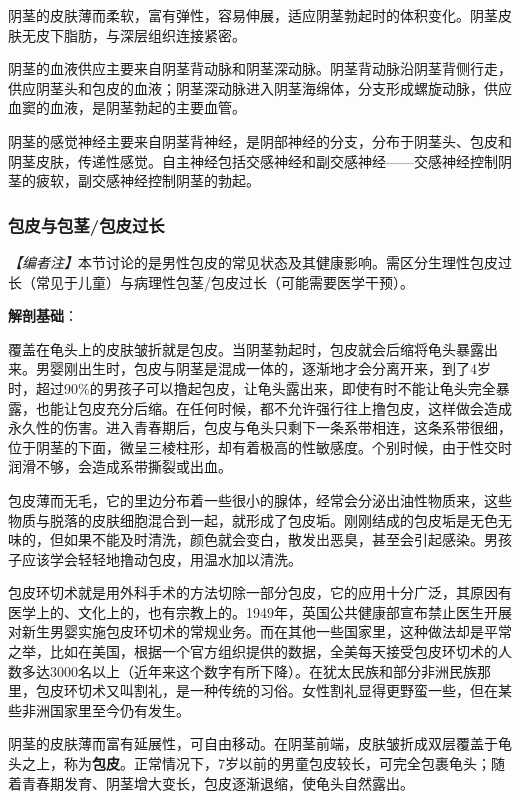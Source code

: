 阴茎的皮肤薄而柔软，富有弹性，容易伸展，适应阴茎勃起时的体积变化。阴茎皮肤无皮下脂肪，与深层组织连接紧密。

阴茎的血液供应主要来自阴茎背动脉和阴茎深动脉。阴茎背动脉沿阴茎背侧行走，供应阴茎头和包皮的血液；阴茎深动脉进入阴茎海绵体，分支形成螺旋动脉，供应血窦的血液，是阴茎勃起的主要血管。

阴茎的感觉神经主要来自阴茎背神经，是阴部神经的分支，分布于阴茎头、包皮和阴茎皮肤，传递性感觉。自主神经包括交感神经和副交感神经——交感神经控制阴茎的疲软，副交感神经控制阴茎的勃起。

\subsubsection{包皮与包茎/包皮过长}

\noindent\textit{【编者注】}本节讨论的是男性包皮的常见状态及其健康影响。需区分生理性包皮过长（常见于儿童）与病理性包茎/包皮过长（可能需要医学干预）。

\vspace{0.5em}
\noindent\textbf{解剖基础}：

覆盖在龟头上的皮肤皱折就是包皮。当阴茎勃起时，包皮就会后缩将龟头暴露出来。男婴刚出生时，包皮与阴茎是混成一体的，逐渐地才会分离开来，到了4岁时，超过90\%的男孩子可以撸起包皮，让龟头露出来，即使有时不能让龟头完全暴露，也能让包皮充分后缩。在任何时候，都不允许强行往上撸包皮，这样做会造成永久性的伤害。进入青春期后，包皮与龟头只剩下一条系带相连，这条系带很细，位于阴茎的下面，微呈三棱柱形，却有着极高的性敏感度。个别时候，由于性交时润滑不够，会造成系带撕裂或出血。

包皮薄而无毛，它的里边分布着一些很小的腺体，经常会分泌出油性物质来，这些物质与脱落的皮肤细胞混合到一起，就形成了包皮垢。刚刚结成的包皮垢是无色无味的，但如果不能及时清洗，颜色就会变白，散发出恶臭，甚至会引起感染。男孩子应该学会轻轻地撸动包皮，用温水加以清洗。

包皮环切术就是用外科手术的方法切除一部分包皮，它的应用十分广泛，其原因有医学上的、文化上的，也有宗教上的。1949年，英国公共健康部宣布禁止医生开展对新生男婴实施包皮环切术的常规业务。而在其他一些国家里，这种做法却是平常之举，比如在美国，根据一个官方组织提供的数据，全美每天接受包皮环切术的人数多达3000名以上（近年来这个数字有所下降）。在犹太民族和部分非洲民族那里，包皮环切术又叫割礼，是一种传统的习俗。女性割礼显得更野蛮一些，但在某些非洲国家里至今仍有发生。

阴茎的皮肤薄而富有延展性，可自由移动。在阴茎前端，皮肤皱折成双层覆盖于龟头之上，称为\textbf{包皮}。正常情况下，7岁以前的男童包皮较长，可完全包裹龟头；随着青春期发育、阴茎增大变长，包皮逐渐退缩，使龟头自然露出。

